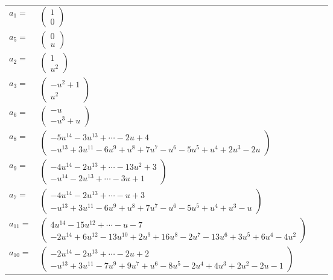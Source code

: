 \documentclass[1p]{elsarticle_modified}
\theoremstyle{definition}
\begin{document}
\begin{tabular}{m{7pt} m{180pt} m{7pt} m{180pt} }
\flushright $a_{1}=$&$\begin{pmatrix}1\\0\end{pmatrix}$ \\
\flushright $a_{5}=$&$\begin{pmatrix}0\\u\end{pmatrix}$ \\
\flushright $a_{2}=$&$\begin{pmatrix}1\\u^2\end{pmatrix}$ \\
\flushright $a_{3}=$&$\begin{pmatrix}- u^2+1\\u^2\end{pmatrix}$ \\
\flushright $a_{6}=$&$\begin{pmatrix}- u\\- u^3+u\end{pmatrix}$ \\
\flushright $a_{8}=$&$\begin{pmatrix}-5 u^{14}-3 u^{13}+\cdots-2 u+4\\- u^{13}+3 u^{11}-6 u^9+u^8+7 u^7- u^6-5 u^5+u^4+2 u^3-2 u\end{pmatrix}$ \\
\flushright $a_{9}=$&$\begin{pmatrix}-4 u^{14}-2 u^{13}+\cdots-13 u^2+3\\- u^{14}-2 u^{13}+\cdots-3 u+1\end{pmatrix}$ \\
\flushright $a_{7}=$&$\begin{pmatrix}-4 u^{14}-2 u^{13}+\cdots- u+3\\- u^{13}+3 u^{11}-6 u^9+u^8+7 u^7- u^6-5 u^5+u^4+u^3- u\end{pmatrix}$ \\
\flushright $a_{11}=$&$\begin{pmatrix}4 u^{14}-15 u^{12}+\cdots- u-7\\-2 u^{14}+6 u^{12}-13 u^{10}+2 u^9+16 u^8-2 u^7-13 u^6+3 u^5+6 u^4-4 u^2\end{pmatrix}$ \\
\flushright $a_{10}=$&$\begin{pmatrix}-2 u^{14}-2 u^{13}+\cdots-2 u+2\\- u^{13}+3 u^{11}-7 u^9+9 u^7+u^6-8 u^5-2 u^4+4 u^3+2 u^2-2 u-1\end{pmatrix}$ \\

\end{tabular}
\end{document}
